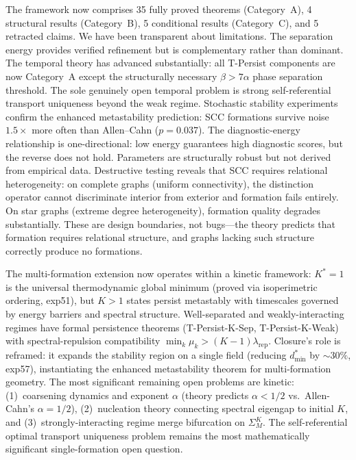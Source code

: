 \documentclass[lettersize,journal]{IEEEtran}
\begin{document}
The framework now comprises 35 fully proved theorems (Category~A), 4 structural results (Category~B), 5 conditional results (Category~C), and 5 retracted claims. We have been transparent about limitations. The separation energy provides verified refinement but is complementary rather than dominant. The temporal theory has advanced substantially: all T-Persist components are now Category~A except the structurally necessary $\beta > 7\alpha$ phase separation threshold. The sole genuinely open temporal problem is strong self-referential transport uniqueness beyond the weak regime. Stochastic stability experiments confirm the enhanced metastability prediction: SCC formations survive noise $1.5\times$ more often than Allen--Cahn ($p = 0.037$). The diagnostic-energy relationship is one-directional: low energy guarantees high diagnostic scores, but the reverse does not hold. Parameters are structurally robust but not derived from empirical data. Destructive testing reveals that SCC requires relational heterogeneity: on complete graphs (uniform connectivity), the distinction operator cannot discriminate interior from exterior and formation fails entirely. On star graphs (extreme degree heterogeneity), formation quality degrades substantially. These are design boundaries, not bugs---the theory predicts that formation requires relational structure, and graphs lacking such structure correctly produce no formations.

The multi-formation extension now operates within a kinetic framework: $K^* = 1$ is the universal thermodynamic global minimum (proved via isoperimetric ordering, exp51), but $K > 1$ states persist metastably with timescales governed by energy barriers and spectral structure. Well-separated and weakly-interacting regimes have formal persistence theorems (T-Persist-K-Sep, T-Persist-K-Weak) with spectral-repulsion compatibility $\min_k \mu_k > (K{-}1)\lambda_{\mathrm{rep}}$. Closure's role is reframed: it expands the stability region on a single field (reducing $d_{\min}^*$ by $\sim 30\%$, exp57), instantiating the enhanced metastability theorem for multi-formation geometry. The most significant remaining open problems are kinetic: (1)~coarsening dynamics and exponent $\alpha$ (theory predicts $\alpha < 1/2$ vs.\ Allen-Cahn's $\alpha = 1/2$), (2)~nucleation theory connecting spectral eigengap to initial $K$, and (3)~strongly-interacting regime merge bifurcation on $\Sigma^K_M$. The self-referential optimal transport uniqueness problem remains the most mathematically significant single-formation open question.
\end{document}
